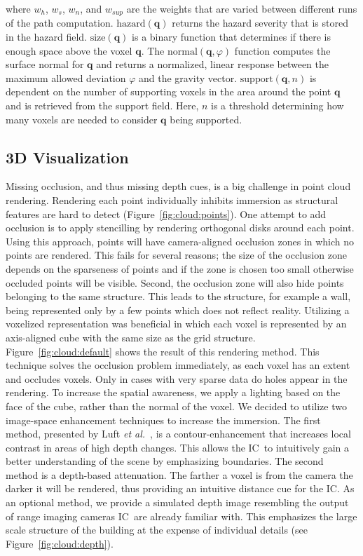 \documentclass[conference,10pt,letter]{IEEEtran}
\def\IC{IC}
\def\etal{\textit{et al.}}
\begin{document}
\noindent where $w_h$, $w_s$, $w_n$, and $w_{sup}$ are the weights that are varied between different runs of the path computation. $\textrm{hazard}(\mathbf{q})$ returns the hazard severity that is stored in the hazard field. $\textrm{size}(\mathbf{q})$ is a binary function that determines if there is enough space above the voxel $\mathbf{q}$. The $\textrm{normal}(\mathbf{q},\varphi)$ function computes the surface normal for $\mathbf{q}$ and returns a normalized, linear response between the maximum allowed deviation $\varphi$ and the gravity vector. $\mathrm{support}(\mathbf{q},n)$ is dependent on the number of supporting voxels in the area around the point $\mathbf{q}$ and is retrieved from the support field. Here, $n$ is a threshold determining how many voxels are needed to consider $\mathbf{q}$ being supported.

\subsection{3D Visualization} \label{sec:overview:3dvisualization}
 Missing occlusion, and thus missing depth cues, is a big challenge in point cloud rendering. Rendering each point individually inhibits immersion as structural features are hard to detect (Figure~\ref{fig:cloud:points}). One attempt to add occlusion is to apply stencilling by rendering orthogonal disks around each point. Using this approach, points will have camera-aligned occlusion zones in which no points are rendered. This fails for several reasons; the size of the occlusion zone depends on the sparseness of points and if the zone is chosen too small otherwise occluded points will be visible. Second, the occlusion zone will also hide points belonging to the same structure. This leads to the structure, for example a wall, being represented only by a few points which does not reflect reality. Utilizing a voxelized representation was beneficial in which each voxel is represented by an axis-aligned cube with the same size as the grid structure. Figure~\ref{fig:cloud:default} shows the result of this rendering method. This technique solves the occlusion problem immediately, as each voxel has an extent and occludes voxels. Only in cases with very sparse data do holes appear in the rendering. To increase the spatial awareness, we apply a lighting based on the face of the cube, rather than the normal of the voxel. We decided to utilize two image-space enhancement techniques to increase the immersion. The first method, presented by Luft \etal~\cite{Luft06imageenhancement}, is a contour-enhancement that increases local contrast in areas of high depth changes. This allows the \IC\ to intuitively gain a better understanding of the scene by emphasizing boundaries. The second method is a depth-based attenuation. The farther a voxel is from the camera the darker it will be rendered, thus providing an intuitive distance cue for the \IC . As an optional method, we provide a simulated depth image resembling the output of range imaging cameras \IC\ are already familiar with. This emphasizes the large scale structure of the building at the expense of individual details (see Figure~\ref{fig:cloud:depth}).
\end{document}
